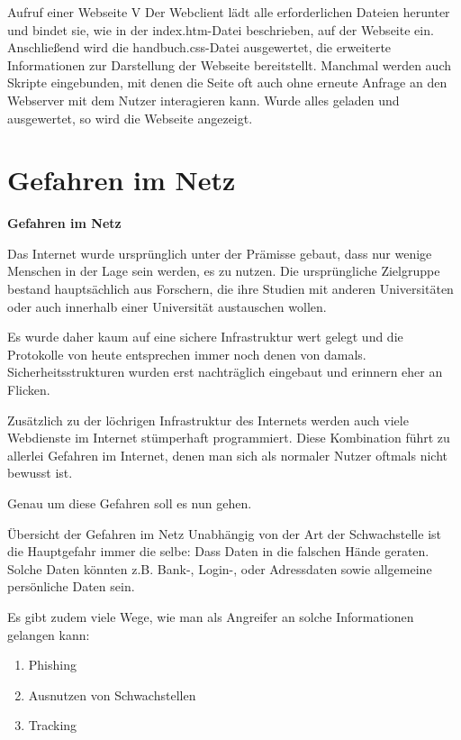 \documentclass[utf8]{beamer}
\begin{document}
	\begin{frame}{Aufruf einer Webseite V}
		Der Webclient lädt alle erforderlichen Dateien herunter und bindet sie, wie in der     index.htm-Datei beschrieben, auf der Webseite ein. Anschließend wird die handbuch.css-Datei ausgewertet, die erweiterte Informationen zur Darstellung der Webseite bereitstellt. Manchmal werden auch Skripte eingebunden, mit denen die Seite oft auch ohne erneute Anfrage an den Webserver mit dem Nutzer interagieren kann. Wurde alles geladen und ausgewertet, so wird die Webseite angezeigt.
	\end{frame}
	
	\section{Gefahren im Netz}
	\begin{frame}
		\centering \huge \textbf{Gefahren im Netz}
	\end{frame}
	
	\begin{frame}
		Das Internet wurde ursprünglich unter der Prämisse gebaut, dass nur wenige Menschen in der Lage sein werden, es zu nutzen. Die ursprüngliche Zielgruppe bestand hauptsächlich aus Forschern, die ihre Studien mit anderen Universitäten oder auch innerhalb einer Universität austauschen wollen.
		
		Es wurde daher kaum auf eine sichere Infrastruktur wert gelegt und die Protokolle von heute entsprechen immer noch denen von damals. Sicherheitsstrukturen wurden erst nachträglich eingebaut und erinnern eher an Flicken.
	\end{frame}

	\begin{frame}
		Zusätzlich zu der löchrigen Infrastruktur des Internets werden auch viele Webdienste im Internet stümperhaft programmiert. Diese Kombination führt zu allerlei Gefahren im Internet, denen man sich als normaler Nutzer oftmals nicht bewusst ist.
		
		Genau um diese Gefahren soll es nun gehen.
	\end{frame}

	\begin{frame}{Übersicht der Gefahren im Netz}
		Unabhängig von der Art der Schwachstelle ist die Hauptgefahr immer die selbe: Dass Daten in die falschen Hände geraten. Solche Daten könnten z.B. Bank-, Login-, oder Adressdaten sowie allgemeine persönliche Daten sein. 
		
		Es gibt zudem viele Wege, wie man als Angreifer an solche Informationen gelangen kann:
		\begin{enumerate}
			\item Phishing
			\item Ausnutzen von Schwachstellen
			\item Tracking			
		\end{enumerate}
	\end{frame}
\end{document}
